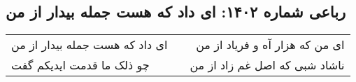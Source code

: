 \begin{center}
\section*{رباعی شماره ۱۴۰۲: ای داد که هست جمله بیدار از من}
\label{sec:1402}
\begin{longtable}{l p{0.5cm} r}
ای داد که هست جمله بیدار از من
&&
ای من که هزار آه و فریاد از من
\\
چو ذلک ما قدمت ایدیکم گفت
&&
ناشاد شبی که اصل غم زاد از من
\\
\end{longtable}
\end{center}
